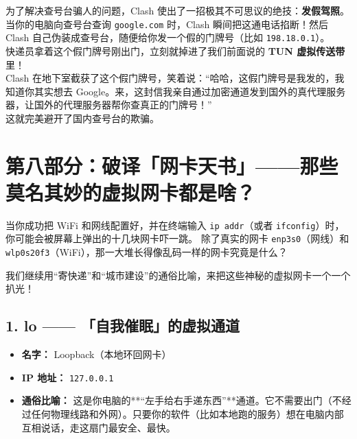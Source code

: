 \documentclass[12pt,a4paper]{ctexart}
\begin{document}
\begin{tcolorbox}[colback=red!5,colframe=red!75!black,title=Clash 的 Fake-IP（假查号）黑科技,fonttitle=\bfseries,boxrule=0.5pt,arc=3mm]
为了解决查号台骗人的问题，Clash 使出了一招极其不可思议的绝技：\textbf{发假驾照}。
当你的电脑向查号台查询 \texttt{google.com} 时，Clash 瞬间把这通电话掐断！然后 Clash 自己伪装成查号台，随便给你发一个假的门牌号（比如 \texttt{198.18.0.1}）。\\
快递员拿着这个假门牌号刚出门，立刻就掉进了我们前面说的 \textbf{TUN 虚拟传送带} 里！ \\
Clash 在地下室截获了这个假门牌号，笑着说：“哈哈，这假门牌号是我发的，我知道你其实想去 Google。来，这封信我亲自通过加密通道发到国外的真代理服务器，让国外的代理服务器帮你查真正的门牌号！” \\
这就完美避开了国内查号台的欺骗。
\end{tcolorbox}

\newpage
\section{第八部分：破译「网卡天书」——那些莫名其妙的虚拟网卡都是啥？}

当你成功把 WiFi 和网线配置好，并在终端输入 \texttt{ip addr}（或者 \texttt{ifconfig}）时，你可能会被屏幕上弹出的十几块网卡吓一跳。
除了真实的网卡 \texttt{enp3s0}（网线）和 \texttt{wlp0s20f3}（WiFi），那一大堆长得像乱码一样的网卡究竟是什么？

我们继续用“寄快递”和“城市建设”的通俗比喻，来把这些神秘的虚拟网卡一个一个扒光！

\subsection{1. lo —— 「自我催眠」的虚拟通道}
\begin{itemize}
    \item \textbf{名字：} Loopback（本地环回网卡）
    \item \textbf{IP 地址：} \texttt{127.0.0.1}
    \item \textbf{通俗比喻：} 这是你电脑的**“左手给右手递东西”**通道。它不需要出门（不经过任何物理线路和外网）。只要你的软件（比如本地跑的服务）想在电脑内部互相说话，走这扇门最安全、最快。
\end{itemize}
\end{document}
